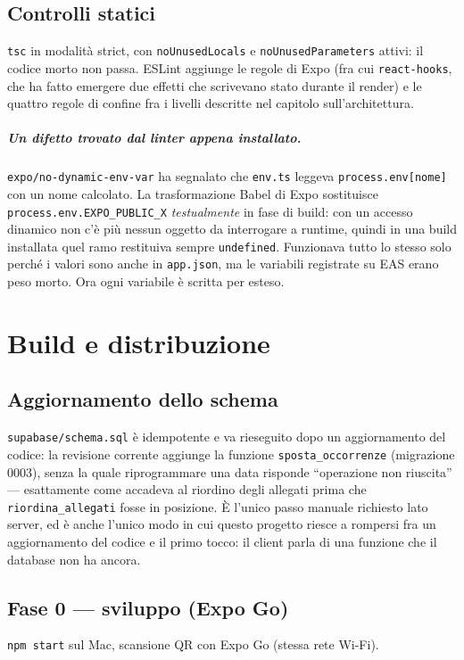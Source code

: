 \documentclass[11pt,a4paper]{report}
\begin{document}
\section{Controlli statici}

\texttt{tsc} in modalit\`a strict, con \texttt{noUnusedLocals} e
\texttt{noUnusedParameters} attivi: il codice morto non passa. ESLint aggiunge
le regole di Expo (fra cui \texttt{react-hooks}, che ha fatto emergere due
effetti che scrivevano stato durante il render) e le quattro regole di
confine fra i livelli descritte nel capitolo sull'architettura.

\paragraph{Un difetto trovato dal linter appena installato.}
\texttt{expo/no-dynamic-env-var} ha segnalato che \texttt{env.ts} leggeva
\texttt{process.env[nome]} con un nome calcolato. La trasformazione Babel di
Expo sostituisce \texttt{process.env.EXPO\_PUBLIC\_X} \emph{testualmente} in
fase di build: con un accesso dinamico non c'\`e pi\`u nessun oggetto da
interrogare a runtime, quindi in una build installata quel ramo restituiva
sempre \texttt{undefined}. Funzionava tutto lo stesso solo perch\'e i valori
sono anche in \texttt{app.json}, ma le variabili registrate su EAS erano peso
morto. Ora ogni variabile \`e scritta per esteso.

\chapter{Build e distribuzione}

\section{Aggiornamento dello schema}

\texttt{supabase/schema.sql} \`e idempotente e va rieseguito dopo un
aggiornamento del codice: la revisione corrente aggiunge la funzione
\texttt{sposta\_occorrenze} (migrazione 0003), senza la quale riprogrammare una
data risponde ``operazione non riuscita'' --- esattamente come accadeva al
riordino degli allegati prima che \texttt{riordina\_allegati} fosse in
posizione. \`E l'unico passo manuale richiesto lato server, ed \`e anche
l'unico modo in cui questo progetto riesce a rompersi fra un aggiornamento del
codice e il primo tocco: il client parla di una funzione che il database non
ha ancora.

\section{Fase 0 — sviluppo (Expo Go)}
\texttt{npm start} sul Mac, scansione QR con Expo Go (stessa rete Wi-Fi).
\end{document}
